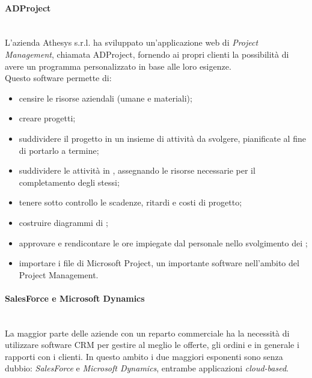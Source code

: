 \documentclass[12pt,a4paper,twoside,openany,english]{book}
\begin{document}
	\paragraph{ADProject}~\\
		L’azienda Athesys s.r.l. ha sviluppato un'applicazione web di \textit{Project Management}, chiamata ADProject, fornendo ai propri clienti la possibilità di avere un programma personalizzato in base alle loro esigenze.\\
		Questo software permette di:
		\begin{itemize}
			\itemsep-0.5em 
			\item censire le risorse aziendali (umane e materiali);
			\item creare progetti;
			\item suddividere il progetto in un insieme di attività da svolgere, pianificate al fine di portarlo a termine;
			\item suddividere le attività in , assegnando le risorse necessarie per il completamento degli stessi;
			\item tenere sotto controllo le scadenze, ritardi e costi di progetto;
			\item costruire diagrammi di ;
			\item approvare e rendicontare le ore impiegate dal personale nello svolgimento dei ;
			\item importare i file di Microsoft Project, un importante software nell'ambito del Project Management.
		\end{itemize} 
	\par
	
	\paragraph{SalesForce e Microsoft Dynamics}~\\
		La maggior parte delle aziende con un reparto commerciale ha la necessità di utilizzare software CRM per gestire al meglio le offerte, gli ordini e in generale i rapporti con i clienti. In questo ambito i due maggiori esponenti sono senza dubbio: \textit{SalesForce} e \textit{Microsoft Dynamics}, entrambe applicazioni \textit{cloud-based}.
	\par
\end{document}
